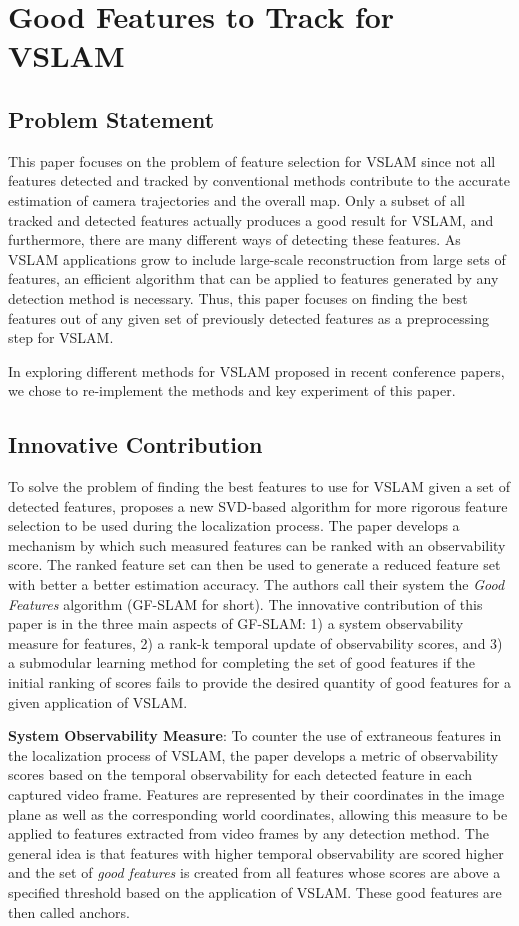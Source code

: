 \documentclass[10pt,twocolumn,letterpaper]{article}
\begin{document}
\section {Good Features to Track for VSLAM}
\subsection{Problem Statement}
This paper focuses on the problem of feature selection for VSLAM since not all features 
detected and tracked by conventional methods contribute to the accurate estimation of 
camera trajectories and the overall map. Only a subset of all tracked and detected features 
actually produces a good result for VSLAM, and furthermore, there are many different ways of
detecting these features. As VSLAM applications grow to include large-scale reconstruction from
 large sets of features, an efficient algorithm that can be applied to features generated by any 
detection method is necessary. Thus, this paper focuses on finding the best features out of any given 
set of previously detected features as a preprocessing step for VSLAM.

In exploring different methods for VSLAM proposed in recent conference papers, 
we chose to re-implement the methods and key experiment of this paper.

\subsection{Innovative Contribution}
To solve the problem of finding the best features to use for VSLAM given a set of detected features, 
\cite{Zhang_2015_CVPR} proposes a new SVD-based algorithm for more rigorous feature selection to be used 
during the localization process. The paper develops a mechanism by which such measured features 
can be ranked with an observability score. The ranked feature set can then be used to generate a 
reduced feature set with better a better estimation accuracy. The authors call their system the \textit{Good 
Features} algorithm (GF-SLAM for short). The innovative contribution of this paper is in the three main 
aspects of GF-SLAM: 1) a system observability measure for features, 2) a rank-k temporal update 
of observability scores, and 3) a submodular learning method for completing the set of good features if 
the initial ranking of scores fails to provide the desired quantity of good features for a given application of 
VSLAM.

\textbf{System Observability Measure}: To counter the use of extraneous features in the localization process 
of VSLAM, the paper develops a metric of observability scores based on the temporal observability 
for each detected feature in each captured video frame. Features are represented by their coordinates in the 
image plane as well as the corresponding world coordinates, allowing this measure to be applied to features 
extracted from video frames by any detection method. The general idea is that features with higher temporal 
observability are scored higher and the set of \textit{good features} is created from all features whose scores are 
above a specified threshold based on the application of VSLAM. These good features are then called 
anchors.
\end{document}
